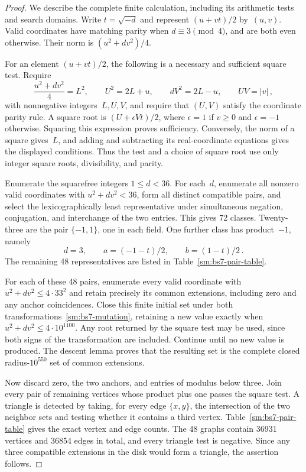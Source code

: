 \documentclass[12pt]{article}
\numberwithin{equation}{section}
\begin{document}
\begin{proof}
We describe the complete finite calculation, including its arithmetic tests and search domains. Write $t=\sqrt{-d}$ and represent $(u+vt)/2$ by~$(u,v)$. Valid coordinates have matching parity when $d\equiv3\pmod4$, and are both even otherwise. Their norm is $(u^2+dv^2)/4$.

For an element $(u+vt)/2$, the following is a necessary and sufficient square test. Require
\begin{equation*}
 \frac{u^2+dv^2}{4}=L^2,\qquad
 U^2=2L+u,\qquad dV^2=2L-u,\qquad UV=|v|\,,
\end{equation*}
with nonnegative integers~$L,U,V$, and require that $(U,V)$ satisfy the coordinate parity rule. A square root is $(U+\epsilon Vt)/2$, where $\epsilon=1$ if $v\ge0$ and $\epsilon=-1$ otherwise. Squaring this expression proves sufficiency. Conversely, the norm of a square gives~$L$, and adding and subtracting its real-coordinate equations gives the displayed conditions. Thus the test and a choice of square root use only integer square roots, divisibility, and parity.

Enumerate the squarefree integers $1\le d<36$. For each~$d$, enumerate all nonzero valid coordinates with $u^2+dv^2<36$, form all distinct compatible pairs, and select the lexicographically least representative under simultaneous negation, conjugation, and interchange of the two entries. This gives 72 classes. Twenty-three are the pair $\{-1,1\}$, one in each field. One further class has product~$-1$, namely
\begin{equation}\label{sm:bs7-exceptional-pair}
 d=3,\qquad a=(-1-t)/2,\qquad b=(1-t)/2\,.
\end{equation}
The remaining 48 representatives are listed in Table~\ref{sm:bs7-pair-table}.

For each of these 48 pairs, enumerate every valid coordinate with $u^2+dv^2\le4\cdot33^2$ and retain precisely its common extensions, including zero and any anchor coincidences. Close this finite initial set under both transformations~\eqref{sm:bs7-mutation}, retaining a new value exactly when $u^2+dv^2\le4\cdot10^{1100}$. Any root returned by the square test may be used, since both signs of the transformation are included. Continue until no new value is produced. The descent lemma proves that the resulting set is the complete closed radius-$10^{550}$ set of common extensions.

Now discard zero, the two anchors, and entries of modulus below three. Join every pair of remaining vertices whose product plus one passes the square test. A triangle is detected by taking, for every edge $\{x,y\}$, the intersection of the two neighbor sets and testing whether it contains a third vertex. Table~\ref{sm:bs7-pair-table} gives the exact vertex and edge counts. The 48 graphs contain 36931 vertices and 36854 edges in total, and every triangle test is negative. Since any three compatible extensions in the disk would form a triangle, the assertion follows.
\end{proof}
\end{document}
